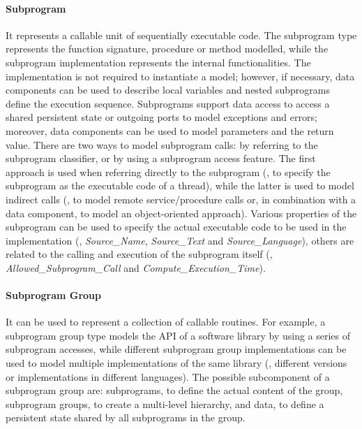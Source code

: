 \paragraph{Subprogram} It represents a callable unit of sequentially executable code. The subprogram type represents the function signature, procedure or method modelled, while the subprogram implementation represents the internal functionalities. The implementation is not required to instantiate a model; however, if necessary, data components can be used to describe local variables and nested subprograms define the execution sequence. Subprograms support data access to access a shared persistent state or outgoing ports to model exceptions and errors; moreover, data components can be used to model parameters and the return value. There are two ways to model subprogram calls: by referring to the subprogram classifier, or by using a subprogram access feature. The first approach is used when referring directly to the subprogram (\eg, to specify the subprogram as the executable code of a thread), while the latter is used to model indirect calls (\eg, to model remote service/procedure calls or, in combination with a data component, to model an object-oriented approach). Various properties of the subprogram can be used to specify the actual executable code to be used in the implementation (\eg, \textit{Source\_Name}, \textit{Source\_Text} and \textit{Source\_Language}), others are related to the calling and execution of the subprogram itself (\eg, \textit{Allowed\_Subprogram\_Call} and \textit{Compute\_Execution\_Time}).

\paragraph{Subprogram Group} It can be used to represent a collection of callable routines. For example, a subprogram group type models the API of a software library by using a series of subprogram accesses, while different subprogram group implementations can be used to model multiple implementations of the same library (\eg, different versions or implementations in different languages). The possible subcomponent of a subprogram group are: subprograms, to define the actual content of the group, subprogram groups, to create a multi-level hierarchy, and data, to define a persistent state shared by all subprograms in the group.

